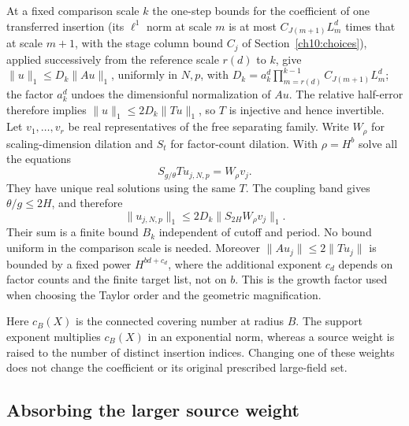 At a fixed comparison scale $k$ the one-step bounds for the coefficient of one transferred insertion (its $\ell^1$ norm at scale $m$ is at most $C_{J(m+1)}L_m^d$ times that at scale $m+1$, with the stage column bound $C_j$ of Section~\ref{ch10:choices}), applied successively from the reference scale $r(d)$ to $k$, give
$\|u\|_1\le D_k\|Au\|_1$, uniformly in $N,p$, with $D_k=a_k^d\prod_{m=r(d)}^{k-1}C_{J(m+1)}L_m^d$; the factor $a_k^d$ undoes the dimensionful normalization of $Au$.
The relative half-error therefore implies
$\|u\|_1\le2D_k\|Tu\|_1$, so $T$ is injective and hence
invertible. Let $v_1,\ldots,v_r$ be real representatives of the
free separating family. Write $W_\rho$ for scaling-dimension
dilation and $S_t$ for factor-count dilation. With
$\rho=H^b$ solve all the equations
\begin{equation}\label{ch11:simultaneous-detector-lifts}
 S_{g/\theta}T u_{j,N,p}=W_\rho v_j.
\end{equation}
They have unique real solutions using the same $T$.
The coupling band gives $\theta/g\le2H$, and therefore
\[
 \|u_{j,N,p}\|_1
 \le2D_k\|S_{2H}W_\rho v_j\|_1.
\]
Their sum is a finite bound $B_k$ independent of cutoff and
period. No bound uniform in the comparison scale is needed.
Moreover $\|Au_j\|\le2\|Tu_j\|$ is bounded by a fixed
power $H^{bd+c_d}$, where the additional exponent $c_d$
depends on factor counts and the finite target list, not on
$b$. This is the growth factor used when choosing the
Taylor order and the geometric magnification.

Here $c_B(X)$ is the connected covering number at radius $B$.
The support exponent multiplies $c_B(X)$ in an exponential norm,
whereas a source weight is raised to the number of distinct
insertion indices. Changing one of these weights does not change
the coefficient or its original prescribed large-field set.

\subsection{Absorbing the larger source weight}
\label{ch11:weight-restoration}

